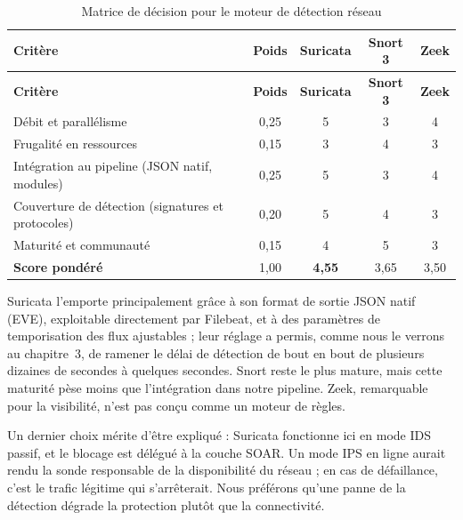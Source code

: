 \renewcommand{\arraystretch}{1.25}
\small
\begin{xltabular}{\textwidth}{|>{\raggedright\arraybackslash}X|c|c|c|c|}

\caption{Matrice de décision pour le moteur de détection réseau}
\label{tab:ids} \\

\hline
{}
\textbf{Critère} & \textbf{Poids} & \textbf{Suricata} & \textbf{Snort 3} & \textbf{Zeek} \cite{zeek_docs} \\ \hline
\endfirsthead

\hline
{}
\textbf{Critère} & \textbf{Poids} & \textbf{Suricata} & \textbf{Snort 3} & \textbf{Zeek} \cite{zeek_docs} \\ \hline
\endhead

Débit et parallélisme & 0,25 & 5 & 3 & 4 \\ \hline
Frugalité en ressources & 0,15 & 3 & 4 & 3 \\ \hline
Intégration au pipeline (JSON natif, modules) & 0,25 & 5 & 3 & 4 \\ \hline
Couverture de détection (signatures et protocoles) & 0,20 & 5 & 4 & 3 \\ \hline
Maturité et communauté & 0,15 & 4 & 5 & 3 \\ \hline
{}
\textbf{Score pondéré} & 1,00 & \textbf{4,55} & 3,65 & 3,50 \\ \hline

\end{xltabular}



Suricata l'emporte principalement grâce à son format de sortie JSON natif (EVE), exploitable directement par Filebeat, et à des paramètres de temporisation des flux ajustables ; leur réglage a permis, comme nous le verrons au chapitre~3, de ramener le délai de détection de bout en bout de plusieurs dizaines de secondes à quelques secondes. Snort reste le plus mature, mais cette maturité pèse moins que l'intégration dans notre pipeline. Zeek, remarquable pour la visibilité, n'est pas conçu comme un moteur de règles.

Un dernier choix mérite d'être expliqué : Suricata fonctionne ici en mode IDS passif, et le blocage est délégué à la couche SOAR. Un mode IPS en ligne aurait rendu la sonde responsable de la disponibilité du réseau ; en cas de défaillance, c'est le trafic légitime qui s'arrêterait. Nous préférons qu'une panne de la détection dégrade la protection plutôt que la connectivité.

